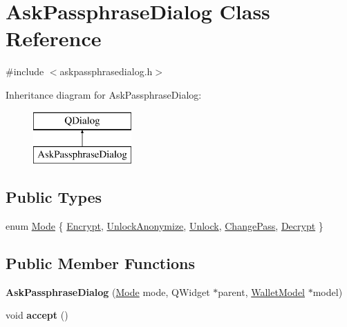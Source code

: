 \hypertarget{class_ask_passphrase_dialog}{}\section{Ask\+Passphrase\+Dialog Class Reference}
\label{class_ask_passphrase_dialog}


{\ttfamily \#include $<$askpassphrasedialog.\+h$>$}

Inheritance diagram for Ask\+Passphrase\+Dialog\+:\begin{figure}[H]
\begin{center}
\leavevmode
\includegraphics[height=2.000000cm]{class_ask_passphrase_dialog}
\end{center}
\end{figure}
\subsection*{Public Types}
\begin{DoxyCompactItemize}
\item 
enum \mbox{\hyperlink{class_ask_passphrase_dialog_a96abf4d3c36c1ef9e268fb546ae76538}{Mode}} \{ \newline
\mbox{\hyperlink{class_ask_passphrase_dialog_a96abf4d3c36c1ef9e268fb546ae76538a5894886141cada548b21488927acc467}{Encrypt}}, 
\mbox{\hyperlink{class_ask_passphrase_dialog_a96abf4d3c36c1ef9e268fb546ae76538abf838fdbee2ab76b043faed745c9ed7b}{Unlock\+Anonymize}}, 
\mbox{\hyperlink{class_ask_passphrase_dialog_a96abf4d3c36c1ef9e268fb546ae76538a2af79cac6134924405d6c620fb0f4c7e}{Unlock}}, 
\mbox{\hyperlink{class_ask_passphrase_dialog_a96abf4d3c36c1ef9e268fb546ae76538abc3f96ab0f90c0a3b0606407b4f662cc}{Change\+Pass}}, 
\newline
\mbox{\hyperlink{class_ask_passphrase_dialog_a96abf4d3c36c1ef9e268fb546ae76538aac5e2489527af224fc5e1316a77ba478}{Decrypt}}
 \}
\end{DoxyCompactItemize}
\subsection*{Public Member Functions}
\begin{DoxyCompactItemize}
\item 
\mbox{\label{class_ask_passphrase_dialog_aa178a465211ad6aa8cab642a295c244c}} 
{\bfseries Ask\+Passphrase\+Dialog} (\mbox{\hyperlink{class_ask_passphrase_dialog_a96abf4d3c36c1ef9e268fb546ae76538}{Mode}} mode, Q\+Widget $\ast$parent, \mbox{\hyperlink{class_wallet_model}{Wallet\+Model}} $\ast$model)
\item 
\mbox{\label{class_ask_passphrase_dialog_ac2f176af3693b73870d26ef0bfc6cbb9}} 
void {\bfseries accept} ()
\end{DoxyCompactItemize}
